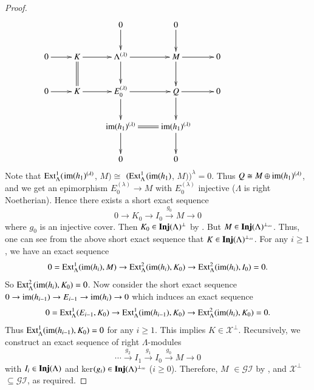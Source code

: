 \documentclass[11pt,a4paper]{article}
\begin{document}
\begin{proof}
 $$\xymatrix{&&0\ar[d]&0\ar[d]&\\0\ar[r]& K\ar[r]
\ar@{=}[d]&\Lambda^{(\lambda)}\ar[d]\ar[r]
&M\ar[d]\ar[r]&0\\
0\ar[r]&  K\ar[r]
& E_{0}^{(\lambda)}\ar[d]\ar[r]
& Q\ar[d]\ar[r]&0\\
 & &{\rm im(}h_{1})^{(\lambda)}\ar[d]\ar@{=}[r]&{\rm im(}h_{1})^{(\lambda)}\ar[d]&&&\\
&&0&0}$$
Note that ${\rm Ext}_{\Lambda}^{1}($${\rm im(}h_{1})^{(\lambda)}$, $M)   \cong  $ $({\rm Ext}_{\Lambda}^{1}$${\rm(im(}h_{1})$, $M))^{\lambda} =  0$.
Thus  $Q \cong M \oplus {\rm im(}h_{1})^{(\lambda)}$, and we get   an epimorphism $E_{0}^{(\lambda)} \rightarrow  M$ with $E_{0}^{(\lambda)}  $ injective ($\Lambda$ is right  Noetherian).
Hence there exists a short exact sequence   $$0 \longrightarrow K_{0} \longrightarrow I_{0}  \stackrel {g_{0}}\longrightarrow M \longrightarrow 0$$
where  $g_{0}$ is an  injective cover.  Then $K_{0}\in {\bf Inj}(\Lambda)^\perp$ by \cite[Corollary 7.2.3]{eno5}. But   $M \in {\bf Inj}(\Lambda)^{\perp_{\infty}}$.
 Thus, one can see from the above short exact sequence that $K \in  {\bf Inj}(\Lambda)^{\perp_{\infty}}$. For any $i \geq 1$, we have an exact sequence
  $$0 = {\rm Ext}_{\Lambda}^{1}{\rm(im}(h_{i}), M)  \rightarrow  {\rm Ext}_{\Lambda}^{2}{\rm(im}(h_{i}), K_{0})  \rightarrow  {\rm Ext}_{\Lambda}^{2}{\rm(im}(h_{i}), I_{0})  = 0.$$
So  $  {\rm Ext}_{\Lambda}^{2}{\rm(im}(h_{i}), K_{0})   = 0$.  Now consider the short exact sequence
$0\rightarrow  {\rm im(}h_{i - 1})  \rightarrow E_{i - 1}\rightarrow {\rm im(}h_{i})\rightarrow 0   $
which  induces an exact sequence  $$0 = {\rm Ext}_{\Lambda}^{1}(E_{i - 1}, K_{0})  \rightarrow  {\rm Ext}_{\Lambda}^{1}{\rm(im}(h_{i-1}), K_{0})  \rightarrow  {\rm Ext}_{\Lambda}^{2}{\rm(im}(h_{i}), K_{0})  = 0.$$
Thus $  {\rm Ext}_{\Lambda}^{1}{\rm(im}(h_{i-1}), K_{0})   = 0$ for any $i \geq 1$. This implies  $K \in \mathscr{X}^{\perp}$.
Recursively, we construct an exact sequence of right $\Lambda$-modules
$$ \cdots \stackrel {g_{2}} \longrightarrow
I_1\stackrel {g_{1}} \longrightarrow I_0\stackrel {g_{0}}
\longrightarrow M  \longrightarrow  0  $$
with $I_i \in {\bf Inj}(\Lambda)$ and ker$(g_i) \in {\bf Inj}(\Lambda)^{\perp_{\infty}}$ ($i \geq 0$).
Therefore, $M $   $\in \mathscr{GI}$ by \cite[Lemma 17(2)]{gii}, and   $\mathscr{X}^\perp $   $\subseteq \mathscr{GI}$, as required. \end{proof}





\medskip
\end{document}
